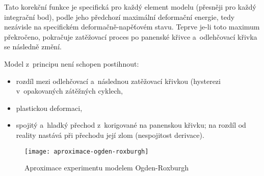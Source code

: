Tato korekční funkce je specifická pro každý element modelu (přesněji pro každý integrační bod), podle jeho předchozí maximální deformační energie, tedy nezávisle na specifickém deformačně-napěťovém stavu.
Teprve je-li toto maximum překročeno, pokračuje zatěžovací proces po panenské křivce a~odlehčovací křivka se následně změní.

Model z~principu není schopen postihnout:
\begin{itemize}
	\item rozdíl mezi odlehčovací a~následnou zatěžovací křivkou (hysterezi v~opakovaných zátěžných cyklech,
	\item plastickou deformaci,
	\item spojitý a~hladký přechod z~korigované na panenskou křivku; na rozdíl od reality nastává při přechodu její zlom (nespojitost derivace).
\end{itemize}

\begin{figure}[H]
	\centering
	\texttt{[image: aproximace-ogden-roxburgh]}
	\caption{Aproximace experimentu modelem Ogden-Roxburgh}
	\label{fig:aproximace-ogden-roxburgh}
\end{figure}
